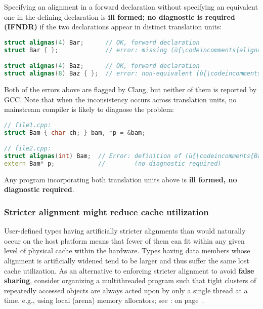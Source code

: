 \noindent Specifying an alignment in a forward declaration without specifying an
equivalent one in the defining declaration is \textbf{ill formed; no diagnostic
is required (IFNDR)} if the two declarations appear in distinct translation
units:

\begin{lstlisting}[language=C++]
struct alignas(4) Bar;      // OK, forward declaration
struct Bar { };             // error: missing (ù{\codeincomments{alignas}}ù) specifier

struct alignas(4) Baz;      // OK, forward declaration
struct alignas(8) Baz { };  // error: non-equivalent (ù{\codeincomments{alignas}}ù) specifier
\end{lstlisting}

\noindent Both of the errors above are flagged by Clang, but neither of them is
reported by GCC. Note that when the inconsistency occurs across
translation units, no mainstream compiler is likely to diagnose the
problem:

\begin{lstlisting}[language=C++]
// file1.cpp:
struct Bam { char ch; } bam, *p = &bam;

// file2.cpp:
struct alignas(int) Bam;  // Error: definition of (ù{\codeincomments{Bam}}ù) lacks alignment specifier.
extern Bam* p;            //        (no diagnostic required)
\end{lstlisting}

\noindent Any program incorporating both translation units above is
\textbf{ill formed, no diagnostic required}.

\subsubsection[Stricter alignment might reduce cache utilization]{Stricter alignment might reduce cache utilization}\label{stricter-alignment-might-reduce-cache-utilization}

User-defined types having artificially stricter alignments than would
naturally occur on the host platform means that fewer of them can fit
within any given level of physical cache within the hardware. Types
having data members whose alignment is artificially widened tend to be
larger and thus suffer the same lost cache utilization. As an
alternative to enforcing stricter alignment to avoid \textbf{false
sharing}, consider organizing a multithreaded program such that tight
clusters of repeatedly accessed objects are always acted upon by only a
single thread at a time, e.g., using local (arena) memory allocators;
see {\it{}:} {\it{}} on page~\pageref{cache-lines,-l1,-l2,-and-l3-cache,-pages,-and-virtual-memory}.


